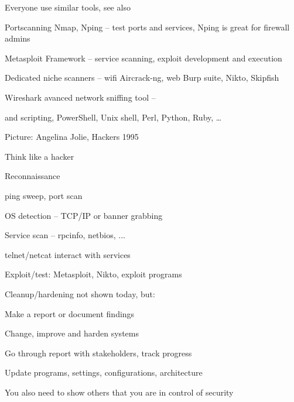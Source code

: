 \documentclass[Screen16to9,17pt]{foils}
\begin{document}

\begin{list2}
\item Everyone use similar tools, see also 
\item Portscanning Nmap, Nping -- test ports and services, Nping is great for firewall admins 
\item Metasploit Framework -- service scanning, exploit development and execution 
\item Dedicated niche scanners -- wifi Aircrack-ng, web Burp suite, Nikto, Skipfish 
\item Wireshark avanced network sniffing tool -- 
\item and scripting, PowerShell, Unix shell, Perl, Python, Ruby, \ldots
\end{list2}

Picture: Angelina Jolie, Hackers 1995





\begin{list1}
\item Think like a hacker
\item Reconnaissance
\begin{list2}
\item ping sweep, port scan
\item OS detection -- TCP/IP or banner grabbing
\item Service scan -- rpcinfo, netbios, ...
\item telnet/netcat interact with services
\end{list2}
\item Exploit/test: Metasploit, Nikto, exploit programs
\item Cleanup/hardening not shown today, but:
\begin{list2}
\item Make a report or document findings
\item Change, improve and harden systems
\item Go through report with stakeholders, track progress
\item Update programs, settings, configurations, architecture
\end{list2}
\item You also need to show others that you are in control of security
\end{list1}
\end{document}
